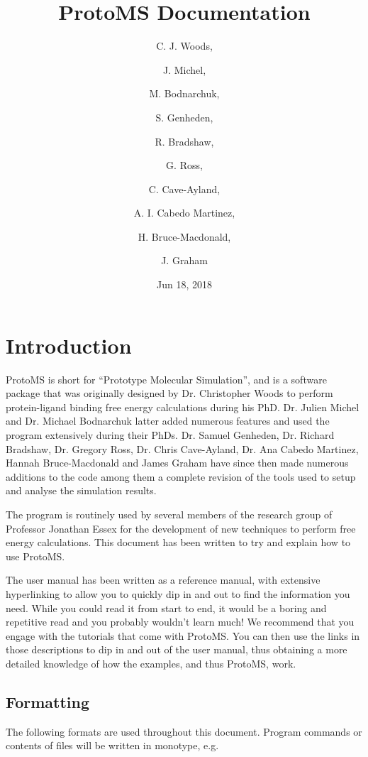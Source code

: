 \documentclass[letterpaper,10pt,english]{sphinxmanual}
\title{ProtoMS Documentation}
\date{Jun 18, 2018}
\author{C. J. Woods, \and J. Michel, \and M. Bodnarchuk, \and S. Genheden, \and R. Bradshaw, \and G. Ross, \and C. Cave-Ayland, \and A. I. Cabedo Martinez, \and H. Bruce-Macdonald, \and J. Graham}
\begin{document}
\maketitle
\sphinxtableofcontents
{}\label{\detokenize{index::doc}}



\chapter{Introduction}
\label{\detokenize{introduction:introduction}}\label{\detokenize{introduction::doc}}
ProtoMS is short for “Prototype Molecular Simulation”, and is a software package that was originally designed by Dr. Christopher Woods to perform protein-ligand binding free energy calculations during his PhD. Dr. Julien Michel and Dr. Michael Bodnarchuk latter added numerous features and used the program extensively during their PhDs. Dr. Samuel Genheden, Dr. Richard Bradshaw, Dr. Gregory Ross, Dr. Chris Cave-Ayland, Dr. Ana Cabedo Martinez, Hannah Bruce-Macdonald and James Graham have since then made numerous additions to the code among them a complete revision of the tools used to setup and analyse the simulation results.

The program is routinely used by several members of the research group of Professor Jonathan Essex for the development of new techniques to perform free energy calculations. This document has been written to try and explain how to use ProtoMS.

The user manual has been written as a reference manual, with extensive hyperlinking to allow you to quickly dip in and out to find the information you need. While you could read it from start to end, it would be a boring and repetitive read and you probably wouldn’t learn much! We recommend that you engage with the tutorials that come with ProtoMS. You can then use the links in those descriptions to dip in and out of the user manual, thus obtaining a more detailed knowledge of how the examples, and thus ProtoMS, work.


\section{Formatting}
\label{\detokenize{introduction:formatting}}
The following formats are used throughout this document. Program commands or contents of files will be written in monotype, e.g.

%
\begin{sphinxVerbatim}[commandchars=\\\{\}]
 
\end{sphinxVerbatim}
\end{document}
